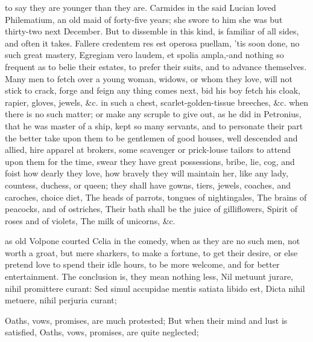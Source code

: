 {to say they are younger than they are. Carmides in the said Lucian
loved Philematium, an old maid of forty-five years; she swore to
him she was but thirty-two next December. But to dissemble in this
kind, is familiar of all sides, and often it takes. Fallere
credentem res est operosa puellam, 'tis soon done, no such great
mastery, Egregiam vero laudem, et spolia ampla,-and nothing so frequent
as to belie their estates, to prefer their suits, and to advance
themselves. Many men to fetch over a young woman, widows, or whom they
love, will not stick to crack, forge and feign any thing comes next,
bid his boy fetch his cloak, rapier, gloves, jewels, \&c. in such a
chest, scarlet-golden-tissue breeches, \&c. when there is no such
matter; or make any scruple to give out, as he did in Petronius, that
he was master of a ship, kept so many servants, and to personate their
part the better take upon them to be gentlemen of good houses, well
descended and allied, hire apparel at brokers, some scavenger or
prick-louse tailors to attend upon them for the time, swear they have
great possessions, bribe, lie, cog, and foist how dearly they
love, how bravely they will maintain her, like any lady, countess,
duchess, or queen; they shall have gowns, tiers, jewels, coaches, and
caroches, choice diet,
The heads of parrots, tongues of nightingales,
The brains of peacocks, and of ostriches,
Their bath shall be the juice of gilliflowers,
Spirit of roses and of violets,
The milk of unicorns, \&c.

as old Volpone courted Celia in the comedy, when as they are no
such men, not worth a groat, but mere sharkers, to make a fortune, to
get their desire, or else pretend love to spend their idle hours, to be
more welcome, and for better entertainment. The conclusion is, they
mean nothing less,
Nil metuunt jurare, nihil promittere curant:
Sed simul accupidae mentis satiata libido est,
Dicta nihil metuere, nihil perjuria curant;

Oaths, vows, promises, are much protested;
But when their mind and lust is satisfied,
Oaths, vows, promises, are quite neglected;

}
